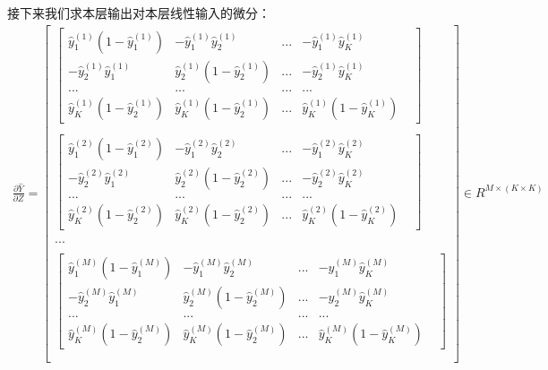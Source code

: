 \documentclass[UTF8]{article}
\begin{document}
接下来我们求本层输出对本层线性输入的微分：
\begin{equation}
\begin{aligned}
\frac{\partial{\hat{Y}}}{\partial{Z}}=\begin{bmatrix}
\begin{bmatrix}
\hat{y}_{1}^{(1)}(1-\hat{y}_{1}^{(1)}) & -\hat{y}_{1}^{(1)}\hat{y}_{2}^{(1)} & ... & -\hat{y}_{1}^{(1)}\hat{y}_{K}^{(1)} \\
 -\hat{y}_{2}^{(1)}\hat{y}_{1}^{(1)} & \hat{y}_{2}^{(1)}(1-\hat{y}_{2}^{(1)}) & ... & -\hat{y}_{2}^{(1)}\hat{y}_{K}^{(1)} \\
 ... & ... & ... &　... \\
 \hat{y}_{K}^{(1)}(1-\hat{y}_{2}^{(1)}) & \hat{y}_{K}^{(1)}(1-\hat{y}_{2}^{(1)}) & ... & \hat{y}_{K}^{(1)}(1-\hat{y}_{K}^{(1)}) &
 \end{bmatrix} \\ \\
\begin{bmatrix}
\hat{y}_{1}^{(2)}(1-\hat{y}_{1}^{(2)}) & -\hat{y}_{1}^{(2)}\hat{y}_{2}^{(2)} & ... & -\hat{y}_{1}^{(2)}\hat{y}_{K}^{(2)} \\
 -\hat{y}_{2}^{(2)}\hat{y}_{1}^{(2)} & \hat{y}_{2}^{(2)}(1-\hat{y}_{2}^{(2)}) & ... & -\hat{y}_{2}^{(2)}\hat{y}_{K}^{(2)} \\
 ... & ... & ... &　... \\
 \hat{y}_{K}^{(2)}(1-\hat{y}_{2}^{(2)}) & \hat{y}_{K}^{(2)}(1-\hat{y}_{2}^{(2)}) & ... & \hat{y}_{K}^{(2)}(1-\hat{y}_{K}^{(2)}) &
 \end{bmatrix} \\ \\
 ... \\ \\
 \begin{bmatrix}
\hat{y}_{1}^{(M)}(1-\hat{y}_{1}^{(M)}) & -\hat{y}_{1}^{(M)}\hat{y}_{2}^{(M)} & ... & -\hat{y}_{1}^{(M)}\hat{y}_{K}^{(M)} \\
 -\hat{y}_{2}^{(M)}\hat{y}_{1}^{(M)} & \hat{y}_{2}^{(M)}(1-\hat{y}_{2}^{(M)}) & ... & -\hat{y}_{2}^{(M)}\hat{y}_{K}^{(M)} \\
 ... & ... & ... &　... \\
 \hat{y}_{K}^{(M)}(1-\hat{y}_{2}^{(M)}) & \hat{y}_{K}^{(M)}(1-\hat{y}_{2}^{(M)}) & ... & \hat{y}_{K}^{(M)}(1-\hat{y}_{K}^{(M)}) &
 \end{bmatrix} \\ \\
\end{bmatrix} \in R^{M \times (K \times K)}
\end{aligned}
\label{mlp-pYhat-pZ-def}
\end{equation}
\end{document}
